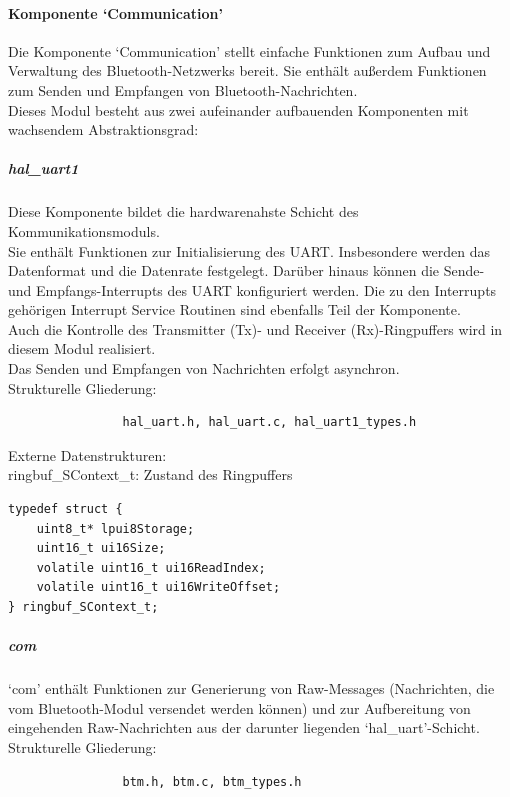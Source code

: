 \documentclass[10pt,a4paper]{article}
\begin{document}
			\paragraph*{Komponente `Communication'}
			Die Komponente `Communication' stellt einfache Funktionen zum Aufbau und Verwaltung  des Bluetooth-Netzwerks bereit.
			Sie enthält außerdem Funktionen zum Senden und Empfangen von Bluetooth-Nachrichten.\\
			 
			Dieses Modul besteht aus zwei aufeinander aufbauenden Komponenten mit wachsendem Abstraktionsgrad:
			
				\subparagraph*{hal\_uart1}
				Diese Komponente bildet die hardwarenahste Schicht des Kommunikationsmoduls. \\
				Sie enthält Funktionen zur Initialisierung des UART. Insbesondere werden das Datenformat und die Datenrate festgelegt.
				Darüber hinaus können die Sende- und Empfangs-Interrupts des UART konfiguriert werden. Die zu den Interrupts gehörigen Interrupt
				Service Routinen sind ebenfalls Teil der Komponente. \\
				Auch die Kontrolle des Transmitter (Tx)- und Receiver (Rx)-Ringpuffers wird in diesem Modul realisiert. \\
				Das Senden und Empfangen von Nachrichten erfolgt asynchron. \\
				
				Strukturelle Gliederung:
				\begin{verbatim}  
				hal_uart.h, hal_uart.c, hal_uart1_types.h
				\end{verbatim}
				
				Externe Datenstrukturen: \\
				ringbuf\_SContext\_t: Zustand des Ringpuffers
				
				\lstset{language = C, tabsize = 4}
				\begin{lstlisting}[frame = single]
typedef struct {
	uint8_t* lpui8Storage;
	uint16_t ui16Size;
	volatile uint16_t ui16ReadIndex;
	volatile uint16_t ui16WriteOffset;
} ringbuf_SContext_t;
				\end{lstlisting}
				
				\subparagraph*{com}
				`com' enthält Funktionen zur Generierung von Raw-Messages (Nachrichten, die vom Bluetooth-Modul versendet werden
				können) und zur Aufbereitung von eingehenden Raw-Nachrichten aus der darunter liegenden `hal\_uart'-Schicht. \\
				
				Strukturelle Gliederung:
				\begin{verbatim}  
				btm.h, btm.c, btm_types.h
				\end{verbatim}
				
\end{document}
